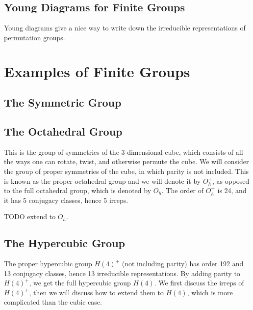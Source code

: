 \documentclass[11pt, oneside]{article}   	%
\theoremstyle{definition}
\begin{document}
\subsection{Young Diagrams for Finite Groups}

Young diagrams give a nice way to write down the irreducible representations of permutation groups. 

\section{Examples of Finite Groups}

\subsection{The Symmetric Group}

\subsection{The Octahedral Group}

This is the group of symmetries of the 3 dimensional cube, which consists of all the ways one can rotate, twist, and otherwise 
permute the cube. We will consider the group of proper symmetries of the cube, in which parity is not included. This is 
known as the proper octahedral group and we will denote it by $O_h^+$, as opposed to the full octahedral group, which 
is denoted by $O_h$. The order of $O_h^+$ is 24, and it has 5 conjugacy classes, hence 5 irreps. 

TODO extend to $O_h$. 

\subsection{The Hypercubic Group}

The proper hypercubic group $H(4)^+$ (not including parity) has order 192 and 13 conjugacy classes, hence 13 irreducible 
representations. By adding parity to $H(4)^+$, we get the full hypercubic group $H(4)$. We first discuss the irreps of 
$H(4)^+$, then we will discuss how to extend them to $H(4)$, which is more complicated than the cubic case. 
\end{document}
